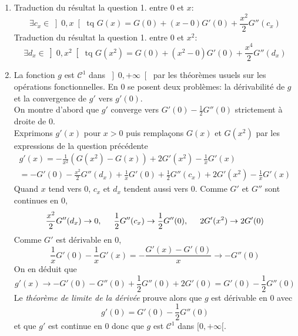 \begin{enumerate}
\begin{enumerate}
 \item Traduction du résultat la question 1. entre $0$ et $x$:
\begin{displaymath}
\exists c_x \in \left] 0,x\right[ \text{ tq } G(x) = G(0)+(x-0)G'(0)+\frac{x^2}{2}G''(c_x)   
\end{displaymath}
Traduction du résultat la question 1. entre $0$ et $x^2$:
\begin{displaymath}
\exists d_x \in \left] 0,x^2\right[ \text{ tq } G(x^2) = G(0)+(x^2-0)G'(0)+\frac{x^4}{2}G''(d_x)  
\end{displaymath}
 
 \item La fonction $g$ est $\mathcal C^1$ dans $\left] 0,+\infty\right[ $ par les théorèmes usuels sur les opérations fonctionnelles. En $0$ se posent deux problèmes: la dérivabilité de $g$ et la convergence de $g'$ vers $g'(0)$.\\
 On montre d'abord  que $g'$ converge vers $G'(0)-\frac{1}{2}G''(0)$ strictement à droite de $0$. \\
Exprimons $g'(x)$ pour $x>0$ puis remplaçons $G(x)$ et $G(x^2)$ par les expressions de la question précédente
\begin{multline*}
 g'(x) = -\frac{1}{x^2}\left( G(x^2) - G(x)\right) + 2G'(x^2) - \frac{1}{x}G'(x)\\
 = -G'(0) - \frac{x^2}{2}G''(d_x) + \frac{1}{x}G'(0) + \frac{1}{2}G''(c_x) + 2G'(x^2) - \frac{1}{x}G'(x)
\end{multline*}
Quand $x$ tend vers $0$, $c_x$ et $d_x$ tendent aussi vers $0$. Comme $G'$ et $G''$ sont continues en $0$,
\begin{displaymath}
  \frac{x^2}{2}G''(d_x)\rightarrow 0,\hspace{0.5cm}
  \frac{1}{2}G''(c_x)\rightarrow \frac{1}{2}G''(0),\hspace{0.5cm}
  2G'(x^2)\rightarrow 2G'(0)
\end{displaymath}
Comme $G'$ est dérivable en $0$,
\begin{displaymath}
  \frac{1}{x}G'(0)- \frac{1}{x}G'(x) = - \frac{G'(x)-G'(0)}{x} \rightarrow -G''(0)
\end{displaymath}
On en déduit que
\begin{displaymath}
  g'(x) \rightarrow -G'(0) - G''(0) + \frac{1}{2}G''(0) + 2G'(0) 
  = G'(0) - \frac{1}{2}G''(0)
\end{displaymath}
Le \emph{théorème de limite de la dérivée} prouve alors que $g$ est dérivable en $0$ avec
\begin{displaymath}
  g'(0) = G'(0) - \frac{1}{2}G''(0)
\end{displaymath}
et que $g'$ est continue en $0$ donc que $g$ est $\mathcal C^1$ dans $[0,+\infty[$.
\end{enumerate}
\end{enumerate}

